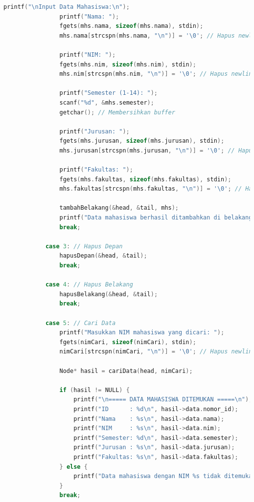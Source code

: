 \documentclass{article}
\begin{document}
\begin{lstlisting}[language=C, caption={Program Double Linked List},
  label={lst:sample-c-code}, basicstyle=\ttfamily\footnotesize,
  keywordstyle=\color{blue}, commentstyle=\color{green},
  stringstyle=\color{red}]
                printf("\nInput Data Mahasiswa:\n");
                printf("Nama: ");
                fgets(mhs.nama, sizeof(mhs.nama), stdin);
                mhs.nama[strcspn(mhs.nama, "\n")] = '\0'; // Hapus newline
                
                printf("NIM: ");
                fgets(mhs.nim, sizeof(mhs.nim), stdin);
                mhs.nim[strcspn(mhs.nim, "\n")] = '\0'; // Hapus newline
                
                printf("Semester (1-14): ");
                scanf("%d", &mhs.semester);
                getchar(); // Membersihkan buffer
                
                printf("Jurusan: ");
                fgets(mhs.jurusan, sizeof(mhs.jurusan), stdin);
                mhs.jurusan[strcspn(mhs.jurusan, "\n")] = '\0'; // Hapus newline
                
                printf("Fakultas: ");
                fgets(mhs.fakultas, sizeof(mhs.fakultas), stdin);
                mhs.fakultas[strcspn(mhs.fakultas, "\n")] = '\0'; // Hapus newline
                
                tambahBelakang(&head, &tail, mhs);
                printf("Data mahasiswa berhasil ditambahkan di belakang\n");
                break;
                
            case 3: // Hapus Depan
                hapusDepan(&head, &tail);
                break;
                
            case 4: // Hapus Belakang
                hapusBelakang(&head, &tail);
                break;
                
            case 5: // Cari Data
                printf("Masukkan NIM mahasiswa yang dicari: ");
                fgets(nimCari, sizeof(nimCari), stdin);
                nimCari[strcspn(nimCari, "\n")] = '\0'; // Hapus newline
                
                Node* hasil = cariData(head, nimCari);
                
                if (hasil != NULL) {
                    printf("\n===== DATA MAHASISWA DITEMUKAN =====\n");
                    printf("ID      : %d\n", hasil->data.nomor_id);
                    printf("Nama    : %s\n", hasil->data.nama);
                    printf("NIM     : %s\n", hasil->data.nim);
                    printf("Semester: %d\n", hasil->data.semester);
                    printf("Jurusan : %s\n", hasil->data.jurusan);
                    printf("Fakultas: %s\n", hasil->data.fakultas);
                } else {
                    printf("Data mahasiswa dengan NIM %s tidak ditemukan\n", nimCari);
                }
                break;
                

\end{lstlisting}
\end{document}
